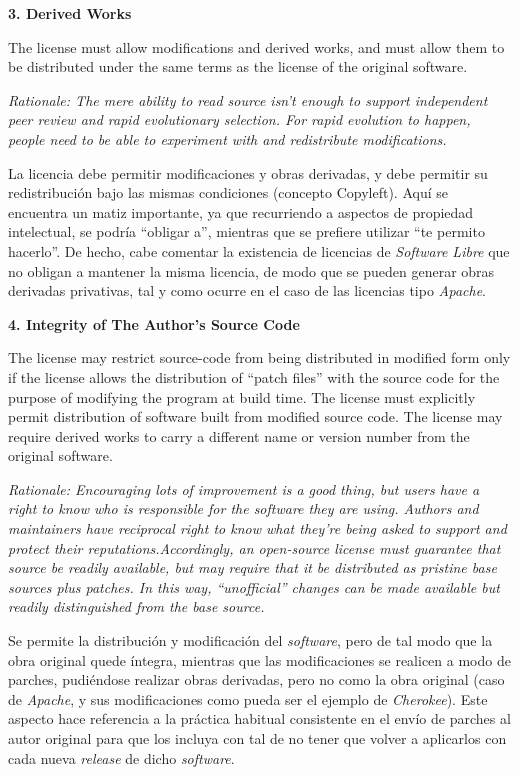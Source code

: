 {\bf 3. Derived Works

The license must allow modifications and derived works, and must allow them to
be distributed under the same terms as the license of the original software.}

\textit{Rationale: The mere ability to read source isn't enough to support
independent peer review and rapid evolutionary selection. For rapid evolution to
happen, people need to be able to experiment with and redistribute
modifications.}\vspace{0.4cm}

La licencia debe permitir modificaciones y obras derivadas, y debe permitir su
redistribución bajo las mismas condiciones (concepto Copyleft). Aquí se encuentra un matiz
importante, ya que recurriendo a aspectos de propiedad intelectual, se podría
``obligar a'', mientras que se prefiere utilizar ``te permito
hacerlo''. De hecho, cabe comentar la existencia de licencias de
\textit{Software Libre} que no obligan a mantener la misma licencia, de modo que
se pueden generar obras derivadas privativas, tal y como ocurre en el caso de
las licencias tipo \textit{Apache}.\vspace{0.4cm}

{\bf 4. Integrity of The Author's Source Code

The license may restrict source-code from being distributed in modified form
only if the license allows the distribution of ``patch files'' with the source
code for the purpose of modifying the program at build time. The license must
explicitly permit distribution of software built from modified source code. The
license may require derived works to carry a different name or version number
from the original software.}

\textit{Rationale: Encouraging lots of improvement is a good thing, but users
have a right to know who is responsible for the software they are using. Authors
and maintainers have reciprocal right to know what they're being asked to
support and protect their reputations.\newline Accordingly, an open-source
license must guarantee that source be readily available, but may require that it
be distributed as pristine base sources plus patches. In this way,
``unofficial'' changes can be made available but readily distinguished from the
base source.}\vspace{0.4cm}

Se permite la distribución y modificación del \textit{software}, pero de tal
modo que la obra original quede íntegra, mientras que las modificaciones se
realicen a modo de parches, pudiéndose realizar obras derivadas, pero no como la
obra original (caso de \textit{Apache}, y sus modificaciones como pueda ser el
ejemplo de \textit{Cherokee}). Este aspecto hace referencia a la práctica
habitual consistente en el envío de parches al autor original para que los
incluya con tal de no tener que volver a aplicarlos con cada nueva
\textit{release} de dicho \textit{software}.\vspace{0.4cm}

